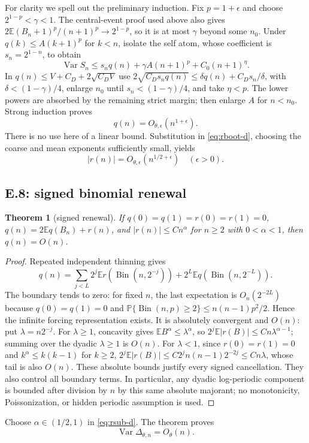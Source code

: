 \documentclass[11pt]{article}
\numberwithin{equation}{section}
\newtheorem{theorem}{Theorem}[section]
\newcommand{\1}{\mathbf 1}\newcommand{\F}{\mathcal F}\newcommand{\D}{\mathcal D}
\begin{document}
For clarity we spell out the preliminary induction.  Fix $p=1+\epsilon$ and
choose $2^{1-p}<\gamma<1$.  The central-event proof used above also gives
$2\mathbb E(B_n+1)^p/(n+1)^p\to2^{1-p}$, so it is at most $\gamma$ beyond
some $n_0$.  Under $q(k)\le A(k+1)^p$ for $k<n$, isolate the self atom, whose
coefficient is $s_n=2^{1-n}$, to obtain
\[
\operatorname{Var}S_n\le s_nq(n)+\gamma A(n+1)^p+C_0(n+1)^\eta.
\]
In $q(n)\le V+C_D+2\sqrt{C_DV}$ use
$2\sqrt{C_Ds_nq(n)}\le\delta q(n)+C_Ds_n/\delta$, with
$\delta<(1-\gamma)/4$, enlarge $n_0$ until $s_n<(1-\gamma)/4$, and take
$\eta<p$.  The lower powers are absorbed by the remaining strict margin;
then enlarge $A$ for $n<n_0$.  Strong induction proves
\begin{equation}q(n)=O_{\theta,\epsilon}(n^{1+\epsilon}).\label{eq:qcoarse-d}\end{equation}
There is no use here of a linear bound.  Substitution in \eqref{eq:rboot-d},
choosing the coarse and mean exponents sufficiently small, yields
\begin{equation}|r(n)|=O_{\theta,\epsilon}(n^{1/2+\epsilon})
\quad(\epsilon>0).\label{eq:rsub-d}\end{equation}

\subsection{E.8: signed binomial renewal}
\begin{theorem}[signed renewal]\label{thm:renew-d}
If $q(0)=q(1)=r(0)=r(1)=0$, $q(n)=2\mathbb Eq(B_n)+r(n)$, and
$|r(n)|\le Cn^\alpha$ for $n\ge2$ with $0<\alpha<1$, then $q(n)=O(n)$.
\end{theorem}
\begin{proof}
Repeated independent thinning gives
\[
q(n)=\sum_{j<L}2^j\mathbb Er(\operatorname{Bin}(n,2^{-j}))
 +2^L\mathbb Eq(\operatorname{Bin}(n,2^{-L})).
\]
The boundary tends to zero: for fixed $n$, the last expectation is
$O_n(2^{-2L})$ because $q(0)=q(1)=0$ and
$\mathbb P\{\operatorname{Bin}(n,p)\ge2\}\le n(n-1)p^2/2$.  Hence the
infinite forcing representation exists.  It is absolutely convergent and
$O(n)$: put $\lambda=n2^{-j}$.  For $\lambda\ge1$, concavity gives
$\mathbb E B^\alpha\le\lambda^\alpha$, so
$2^j\mathbb E|r(B)|\le Cn\lambda^{\alpha-1}$; summing over the dyadic
$\lambda\ge1$ is $O(n)$.  For $\lambda<1$, since $r(0)=r(1)=0$ and
$k^\alpha\le k(k-1)$ for $k\ge2$,
$2^j\mathbb E|r(B)|\le C2^jn(n-1)2^{-2j}\le Cn\lambda$, whose tail is also
$O(n)$.  These absolute bounds justify every signed cancellation.  They
also control all boundary terms.  In particular, any dyadic log-periodic
component is bounded after division by $n$ by this same absolute majorant;
no monotonicity, Poissonization, or hidden periodic assumption is used.
\end{proof}
Choose $\alpha\in(1/2,1)$ in \eqref{eq:rsub-d}.  The theorem proves
\begin{equation}\boxed{\operatorname{Var}\Delta_{\theta,n}=O_\theta(n).}
\label{eq:renew-result-d}\end{equation}
\end{document}
